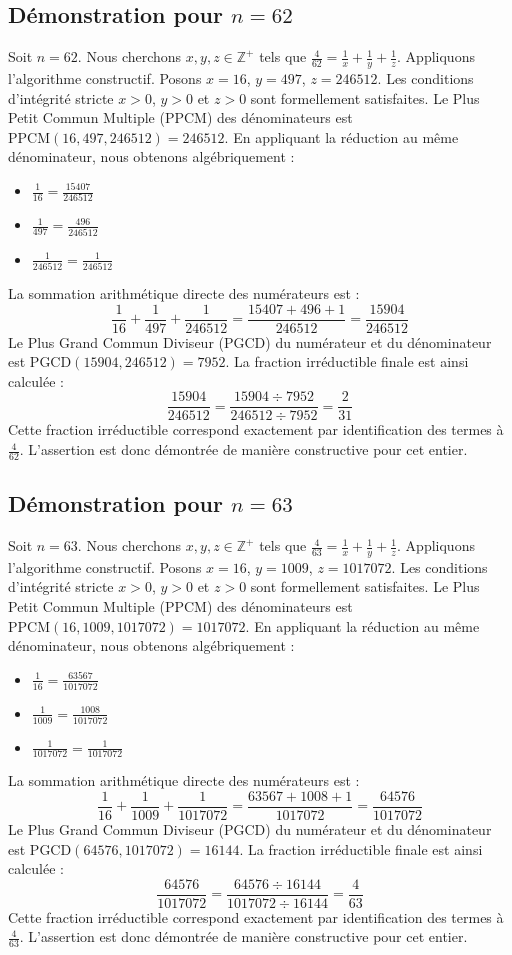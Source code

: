 \documentclass[11pt,a4paper]{article}
\begin{document}
\subsection{Démonstration pour $n = 62$}
Soit $n = 62$. Nous cherchons $x, y, z \in \mathbb{Z}^{+}$ tels que $\frac{4}{62} = \frac{1}{x} + \frac{1}{y} + \frac{1}{z}$.
Appliquons l'algorithme constructif. Posons $x = 16$, $y = 497$, $z = 246512$.
Les conditions d'intégrité stricte $x > 0$, $y > 0$ et $z > 0$ sont formellement satisfaites.
Le Plus Petit Commun Multiple (PPCM) des dénominateurs est $\text{PPCM}(16, 497, 246512) = 246512$.
En appliquant la réduction au même dénominateur, nous obtenons algébriquement :
\begin{itemize}
    \item $\frac{1}{16} = \frac{15407}{246512}$
    \item $\frac{1}{497} = \frac{496}{246512}$
    \item $\frac{1}{246512} = \frac{1}{246512}$
\end{itemize}
La sommation arithmétique directe des numérateurs est :
$$ \frac{1}{16} + \frac{1}{497} + \frac{1}{246512} = \frac{15407 + 496 + 1}{246512} = \frac{15904}{246512} $$
Le Plus Grand Commun Diviseur (PGCD) du numérateur et du dénominateur est $\text{PGCD}(15904, 246512) = 7952$.
La fraction irréductible finale est ainsi calculée :
$$ \frac{15904}{246512} = \frac{15904 \div 7952}{246512 \div 7952} = \frac{2}{31} $$
Cette fraction irréductible correspond exactement par identification des termes à $\frac{4}{62}$. L'assertion est donc démontrée de manière constructive pour cet entier.

\subsection{Démonstration pour $n = 63$}
Soit $n = 63$. Nous cherchons $x, y, z \in \mathbb{Z}^{+}$ tels que $\frac{4}{63} = \frac{1}{x} + \frac{1}{y} + \frac{1}{z}$.
Appliquons l'algorithme constructif. Posons $x = 16$, $y = 1009$, $z = 1017072$.
Les conditions d'intégrité stricte $x > 0$, $y > 0$ et $z > 0$ sont formellement satisfaites.
Le Plus Petit Commun Multiple (PPCM) des dénominateurs est $\text{PPCM}(16, 1009, 1017072) = 1017072$.
En appliquant la réduction au même dénominateur, nous obtenons algébriquement :
\begin{itemize}
    \item $\frac{1}{16} = \frac{63567}{1017072}$
    \item $\frac{1}{1009} = \frac{1008}{1017072}$
    \item $\frac{1}{1017072} = \frac{1}{1017072}$
\end{itemize}
La sommation arithmétique directe des numérateurs est :
$$ \frac{1}{16} + \frac{1}{1009} + \frac{1}{1017072} = \frac{63567 + 1008 + 1}{1017072} = \frac{64576}{1017072} $$
Le Plus Grand Commun Diviseur (PGCD) du numérateur et du dénominateur est $\text{PGCD}(64576, 1017072) = 16144$.
La fraction irréductible finale est ainsi calculée :
$$ \frac{64576}{1017072} = \frac{64576 \div 16144}{1017072 \div 16144} = \frac{4}{63} $$
Cette fraction irréductible correspond exactement par identification des termes à $\frac{4}{63}$. L'assertion est donc démontrée de manière constructive pour cet entier.
\end{document}
